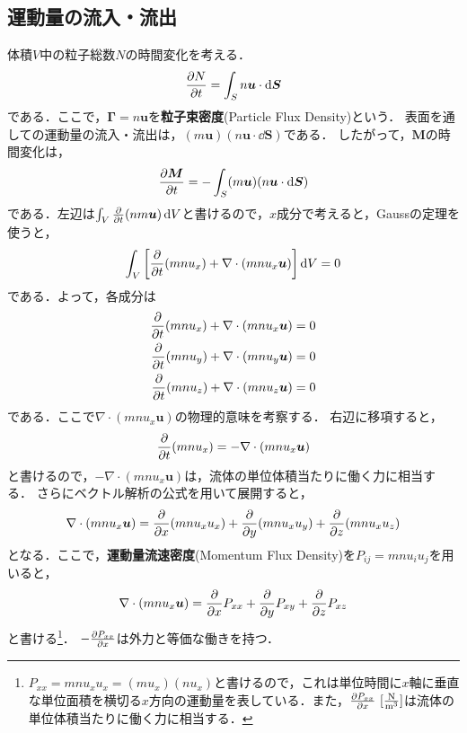 \documentclass{report}
\begin{document}
    \subsection{運動量の流入・流出}
      \label{subsec:momentum_flux}
      体積$V$中の粒子総数$N$の時間変化を考える．
      \begin{align}
        \pdv{N}{t} = \int_S n\bm{u} \cdot \dd{\bm{S}}
      \end{align}
      である．ここで，$\bm{\Gamma} = n\bm{u}$を\textbf{粒子束密度}(Particle Flux Density)という．
      表面を通しての運動量の流入・流出は，$(m\bm{u})(n\bm{u}\cdot \dd{\bm{S}})$である．
      したがって，$\bm{M}$の時間変化は，
      \begin{align}
        \pdv{\bm{M}}{t} = -\int_S (m\bm{u})(n\bm{u}\cdot \dd{\bm{S}})
      \end{align}
      である．左辺は$\int_V \pdv{t}(n m \bm{u}) \dd{V}$と書けるので，$x$成分で考えると，Gaussの定理を使うと，
      \begin{align}
        \int_V \qty[\pdv{t}(mnu_x) + \nabla \cdot (mnu_x \bm{u})] \dd{V} = 0
      \end{align}
      である．よって，各成分は
      \begin{align}
        \pdv{t}(mnu_x) + \nabla \cdot (mnu_x \bm{u}) = 0\\
        \pdv{t}(mnu_y) + \nabla \cdot (mnu_y \bm{u}) = 0\\
        \pdv{t}(mnu_z) + \nabla \cdot (mnu_z \bm{u}) = 0
      \end{align}
      である．ここで$\nabla \cdot (mnu_x \bm{u}) $の物理的意味を考察する．
      右辺に移項すると，
      \begin{align}
        \pdv{t}(mnu_x) = -\nabla \cdot (mnu_x \bm{u})
      \end{align}
      と書けるので，$-\nabla \cdot (mnu_x \bm{u})$は，流体の単位体積当たりに働く力に相当する．
      さらにベクトル解析の公式を用いて展開すると，
      \begin{align}
        \nabla \cdot (mnu_x \bm{u}) = \pdv{x}(mnu_x u_x) + \pdv{y}(mnu_x u_y) + \pdv{z}(mnu_x u_z)
      \end{align}
      となる．ここで，\textbf{運動量流速密度}(Momentum Flux Density)を$P_{ij} = mnu_i u_j$を用いると，
      \begin{align}
        \nabla \cdot (mnu_x \bm{u}) = \pdv{x}P_{xx} + \pdv{y}P_{xy} + \pdv{z}P_{xz}
      \end{align}
      と書ける\footnote{$P_{xx} = mnu_xu_x = (mu_x)(nu_x)$と書けるので，これは単位時間に$x$軸に垂直な単位面積を横切る$x$方向の運動量を表している．また，$\pdv{P_{xx}}{x}\ [\frac{\r{N}}{\r{m}^3}]$は流体の単位体積当たりに働く力に相当する．}．
      $-\pdv{P_{xx}}{x}$は外力と等価な働きを持つ．
\end{document}
